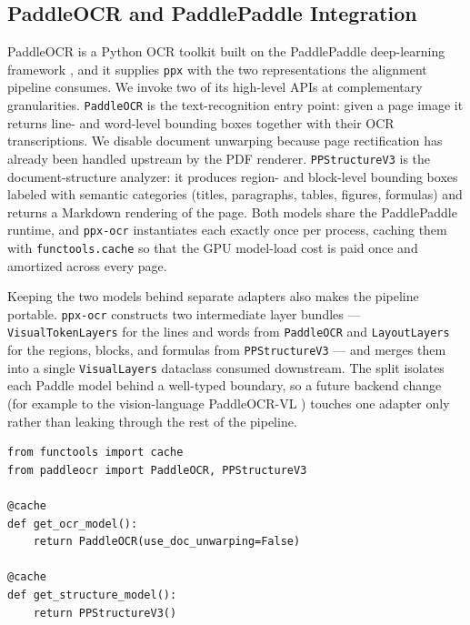 \documentclass{article}
\theoremstyle{definition}
\begin{document}
\subsection{PaddleOCR and PaddlePaddle Integration}
\label{sec:paddle}

PaddleOCR is a Python OCR toolkit built on the PaddlePaddle
deep-learning framework \cite{PaddleOCR30}, and it supplies
\texttt{ppx} with the two representations the alignment pipeline
consumes.  We invoke two of its high-level APIs at complementary
granularities.  \texttt{PaddleOCR} \cite{PaddleOCRv3} is the
text-recognition entry point: given a page image it returns line-
and word-level bounding boxes together with their OCR
transcriptions.  We disable document unwarping because page
rectification has already been handled upstream by the PDF
renderer.  \texttt{PPStructureV3} \cite{PPDocLayout} is the
document-structure analyzer: it produces region- and block-level
bounding boxes labeled with semantic categories (titles,
paragraphs, tables, figures, formulas) and returns a Markdown
rendering of the page.  Both models share the PaddlePaddle runtime,
and \texttt{ppx-ocr} instantiates each exactly once per process,
caching them with \texttt{functools.cache} so that the GPU
model-load cost is paid once and amortized across every page.

Keeping the two models behind separate adapters also makes the
pipeline portable.  \texttt{ppx-ocr} constructs two intermediate
layer bundles --- \texttt{VisualTokenLayers} for the lines and words
from \texttt{PaddleOCR} and \texttt{LayoutLayers} for the regions,
blocks, and formulas from \texttt{PPStructureV3} --- and merges them
into a single \texttt{VisualLayers} dataclass consumed downstream.
The split isolates each Paddle model behind a well-typed boundary,
so a future backend change (for example to the vision-language
PaddleOCR-VL \cite{paddleocrvl2025}) touches one adapter only rather
than leaking through the rest of the pipeline.

\begin{lstlisting}[caption={Caching PaddlePaddle model instances
      (\texttt{ppx-ocr/core/ocr.py}).},
    label={lst:paddle-models}]
from functools import cache
from paddleocr import PaddleOCR, PPStructureV3

@cache
def get_ocr_model():
    return PaddleOCR(use_doc_unwarping=False)

@cache
def get_structure_model():
    return PPStructureV3()
\end{lstlisting}
\end{document}
